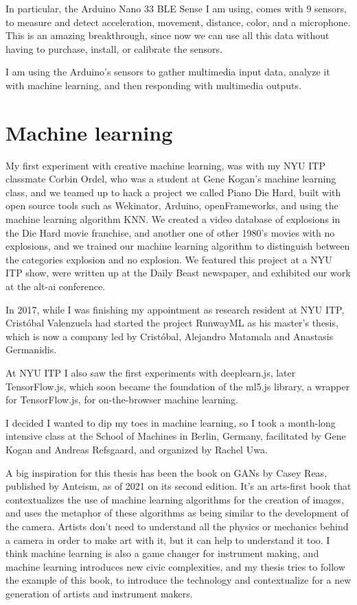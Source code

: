 In particular, the Arduino Nano 33 BLE Sense I am using, comes with 9 sensors, to measure and detect acceleration, movement, distance, color, and a microphone. This is an amazing breakthrough, since now we can use all this data without having to purchase, install, or calibrate the sensors.

I am using the Arduino's sensors to gather multimedia input data, analyze it with machine learning, and then responding with multimedia outputs.

\section{Machine learning}

My first experiment with creative machine learning, was with my NYU ITP classmate Corbin Ordel, who was a student at Gene Kogan's machine learning class, and we teamed up to hack a project we called Piano Die Hard, built with open source tools such as Wekinator, Arduino, openFrameworks, and using the machine learning algorithm KNN. We created a video database of explosions in the Die Hard movie franchise, and another one of other 1980's movies with no explosions, and we trained our machine learning algorithm to distinguish between the categories explosion and no explosion. We featured this project at a NYU ITP show, were written up at the Daily Beast newspaper, and exhibited our work at the alt-ai conference.

In 2017, while I was finishing my appointment as research resident at NYU ITP, Cristóbal Valenzuela had started the project RunwayML as his master's thesis, which is now a company led by Cristóbal, Alejandro Matamala and Anastasis Germanidis.

At NYU ITP I also saw the first experiments with deeplearn.js, later TensorFlow.js, which soon became the foundation of the ml5.js library, a wrapper for TensorFlow.js, for on-the-browser machine learning.

I decided I wanted to dip my toes in machine learning, so I took a month-long intensive class at the School of Machines in Berlin, Germany, facilitated by Gene Kogan and Andreas Refsgaard, and organized by Rachel Uwa.

A big inspiration for this thesis has been the book on GANs by Casey Reas, published by Anteism, as of 2021 on its second edition. It’s an arts-first book that contextualizes the use of machine learning algorithms for the creation of images, and uses the metaphor of these algorithms as being similar to the development of the camera. Artists don’t need to understand all the physics or mechanics behind a camera in order to make art with it, but it can help to understand it too. I think machine learning is also a game changer for instrument making, and machine learning introduces new civic complexities, and my thesis tries to follow the example of this book, to introduce the technology and contextualize for a new generation of artists and instrument makers.

